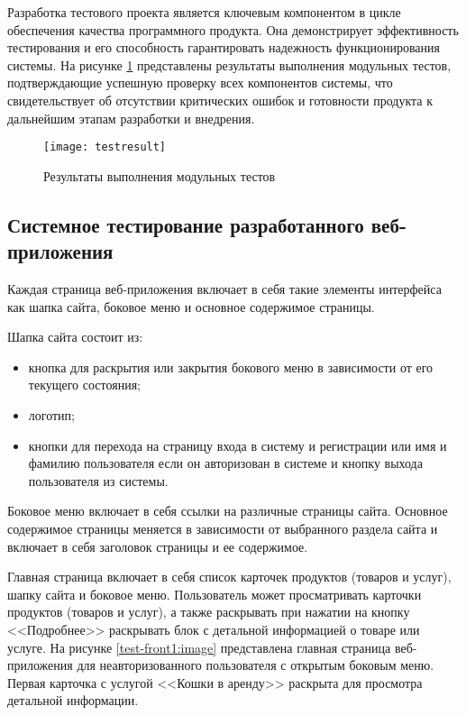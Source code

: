 Разработка тестового проекта является ключевым компонентом в цикле обеспечения качества программного продукта. Она демонстрирует эффективность тестирования и его способность гарантировать надежность функционирования системы. На рисунке \ref{testresult:image} представлены результаты выполнения модульных тестов, подтверждающие успешную проверку всех компонентов системы, что свидетельствует об отсутствии критических ошибок и готовности продукта к дальнейшим этапам разработки и внедрения.

\newpage %
\begin{figure}[H] %
\centering
\texttt{[image: testresult]}
\caption{Результаты выполнения модульных тестов}
\label{testresult:image}
\end{figure}

\subsection{Системное тестирование разработанного веб-приложения}

Каждая страница веб-приложения включает в себя такие элементы интерфейса как шапка сайта, боковое меню и основное содержимое страницы.

Шапка сайта состоит из:
\begin{itemize}
    \item кнопка для раскрытия или закрытия бокового меню в зависимости от его текущего состояния;
    \item логотип;
    \item кнопки для перехода на страницу входа в систему и регистрации или имя и фамилию пользователя если он авторизован в системе и кнопку выхода пользователя из системы.
\end{itemize}

Боковое меню включает в себя ссылки на различные страницы сайта.
Основное содержимое страницы меняется в зависимости от выбранного раздела сайта и включает в себя заголовок страницы и ее содержимое. 

Главная страница включает в себя список карточек продуктов (товаров и услуг), шапку сайта и боковое меню. Пользователь может просматривать карточки продуктов (товаров и услуг), а также раскрывать при нажатии на кнопку <<Подробнее>> раскрывать блок с детальной информацией о товаре или услуге.
На рисунке \ref{test-front1:image} представлена главная страница веб-приложения для неавторизованного пользователя с открытым боковым меню. Первая карточка с услугой <<Кошки в аренду>> раскрыта для просмотра детальной информации.

